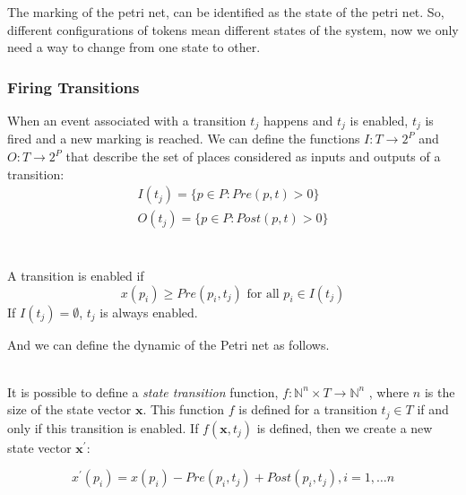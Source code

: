  The marking of the petri net, can be identified as the
state of the petri net. So, different configurations of tokens mean different
states of the system, now we only need a way to change from one state to other.
\subsubsection{Firing Transitions}
\label{sec:firingTransitions}
 When an event associated with a transition $t_j$  happens and $t_j$
is enabled, $t_j$ is fired and  a new marking is reached.
We can define the functions $I : T \rightarrow 2^P$ and $O : T \rightarrow 2^P$ that
describe the set of places considered as inputs and outputs of a transition: 
\begin{align*}
  I(t_j)= \{p \in P : Pre(p,t)> 0\}\\
  O(t_j)= \{p \in P : Post(p,t)> 0\}\\
\end{align*}
\begin{definition}
  \label{def:enabledTransition}~\\
  A transition is enabled if
  \[ x(p_i)\geq Pre(p_i,t_j) \text{ for all }{p_i \in I(t_j)}\]
  If $I(t_j)=\emptyset$, $t_j$ is always enabled. 
\end{definition}

And we can define the dynamic of the Petri net as follows. 

\begin{definition}
  \label{def:petriNetDynamics}~\\
   It is possible to define a \emph{state transition}
  function, $f : \mathbb{N}^n \times T \rightarrow \mathbb{N}^n$  , where $n$ is
  the size of the state vector $\mathbf{x}$. This function $f$ is defined for
  a transition $t_j \in T$ if and only if this transition is enabled. If
  $f(\mathbf{x},t_j)$ is defined, then we create a new state vector
  $\mathbf{x}^\prime$:

  \[ x^\prime(p_i) = x(p_i) - Pre(p_i,t_j) + Post(p_i,t_j), i=1,\dots n \]
\end{definition}
  
